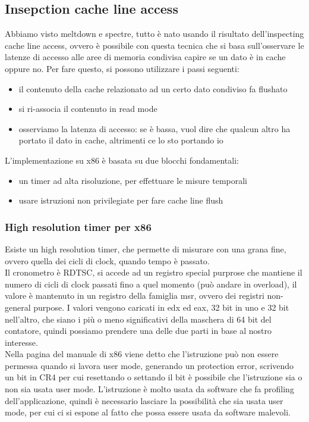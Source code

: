 \documentclass[14pt, oneside]{book}
\begin{document}
\subsection{Insepction cache line access}
Abbiamo visto meltdown e spectre, tutto è nato usando il risultato dell'inspecting cache line access, ovvero è possibile con questa tecnica che si basa sull'osservare le latenze di accesso alle aree di memoria condivisa capire se un dato è in cache oppure no. Per fare questo, si possono utilizzare i passi seguenti:
\begin{itemize}
\item il contenuto della cache relazionato ad un certo dato condiviso fa flushato
\item si ri-associa il contenuto in read mode
\item osserviamo la latenza di accesso: se è bassa, vuol dire che qualcun altro ha portato il dato in cache, altrimenti  ce lo sto portando io
\end{itemize}
L'implementazione su x86 è basata su due blocchi fondamentali:
\begin{itemize}
\item un timer ad alta risoluzione, per effettuare le misure temporali
\item usare istruzioni non privilegiate per fare cache line flush
\end{itemize}
\subsubsection{High resolution timer per x86}
Esiste un high resolution timer, che permette di misurare con una grana fine, ovvero quella dei cicli di clock, quando tempo è passato.\\ Il cronometro è RDTSC, si accede ad un registro special purprose che mantiene il numero di cicli di clock passati fino a quel momento (può andare in overload), il valore è mantenuto in un registro della famiglia msr, ovvero dei registri non-general purpose. I valori vengono caricati in edx ed eax, 32 bit in uno e 32 bit nell'altro, che siano i più o meno significativi della maschera di 64 bit del contatore, quindi possiamo prendere una delle due parti in base al nostro interesse.\\ Nella pagina del manuale di x86 viene detto che l'istruzione può non essere permessa quando si lavora user mode, generando un protection error, scrivendo un bit in CR4 per cui resettando o settando il bit è possibile che l'istruzione sia o non sia usata user mode. L'istruzione è molto usata da software che fa profiling dell'applicazione, quindi è necessario lasciare la possibilità che sia usata user mode, per cui ci si espone al fatto che possa essere usata da software malevoli.
\end{document}
